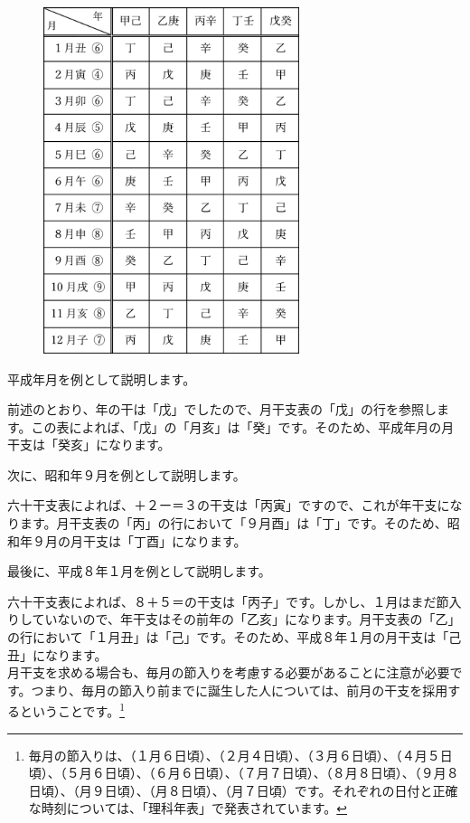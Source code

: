 \documentclass[a5paper,11pt,dvipdfmx]{tarticle}
\begin{document}
\begin{figure}[h]
  \centering
  \includegraphics[width=75mm,angle=90]{figs/table3-1.eps}
\end{figure}

平成年月を例として説明します。

前述のとおり、年の干は「戊」でしたので、月干支表の「戊」の行を参照します。この表によれば、「戊」の「月亥」は「癸」です。そのため、平成年月の月干支は「癸亥」になります。

次に、昭和年９月を例として説明します。

六十干支表によれば、＋２ー＝３の干支は「丙寅」ですので、これが年干支になります。月干支表の「丙」の行において「９月酉」は「丁」です。そのため、昭和年９月の月干支は「丁酉」になります。

最後に、平成８年１月を例として説明します。

六十干支表によれば、８＋５＝の干支は「丙子」です。しかし、１月はまだ節入りしていないので、年干支はその前年の「乙亥」になります。月干支表の「乙」の行において「１月丑」は「己」です。そのため、平成８年１月の月干支は「己丑」になります。\\

月干支を求める場合も、毎月の節入りを考慮する必要があることに注意が必要です。つまり、毎月の節入り前までに誕生した人については、前月の干支を採用するということです。\footnote{毎月の節入りは、（１月６日頃）、（２月４日頃）、（３月６日頃）、（４月５日頃）、（５月６日頃）、（６月６日頃）、（７月７日頃）、（８月８日頃）、（９月８日頃）、（月９日頃）、（月８日頃）、（月７日頃）です。それぞれの日付と正確な時刻については、「理科年表」で発表されています。}
\end{document}
